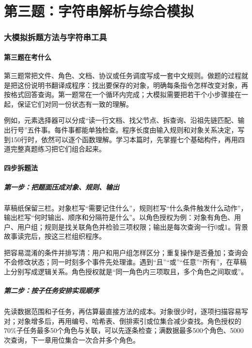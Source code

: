 \clearpage
\part{第三题：字符串解析与综合模拟}
\section{大模拟拆题方法与字符串工具}
\subsection{第三题在考什么}
第三题常把文件、角色、文档、协议或任务调度写成一套中文规则。做题的过程就是把这份说明书翻译成程序：找出要保存的对象，明确每条指令怎样改变对象，再按格式回答查询。第一题常在一个循环内完成；大模拟需要把若干个小步骤接在一起，保证它们对同一份状态有一致的理解。

例如，元素选择器可以分成“读一行文档、找父节点、拆查询、沿祖先链匹配、输出行号”五件事。每件事都能单独检查。程序长度由输入规则和对象关系决定，写到150行时，依然可以逐个函数理解。学习本篇时，先掌握七个基础构件，再用四道完整真题练习把它们组合起来。

\subsection{四步拆题法}
\subsubsection{第一步：把题面压成对象、规则、输出}
草稿纸保留三栏。对象栏写“需要记住什么”，规则栏写“什么条件触发什么动作”，输出栏写“何时输出、顺序和分隔符是什么”。以角色授权为例：对象有角色、用户、用户组；规则是找关联角色并检验三项权限；输出是每次查询一行0或1。背景故事读完后，按这三栏组织程序。

把容易混淆的条件并排写清：用户和用户组怎样区分；重复操作是否叠加；查询会不会修改状态；同一时刻多个事件先处理谁。遇到“且”“或”“任意”“所有”，在草稿上分别写成逻辑关系。角色授权就是“同一角色内三项取且，多个角色之间取或”。

\subsubsection{第二步：按子任务安排实现顺序}
先读数据范围和子任务，再估算最直接方法的成本。对象很少时，逐项扫描容易写对；对象增多后，再用编号、哈希表、倒排索引或位集合减少查找。角色授权的70\%子任务最多50个角色与关联，可以先逐条检查；满数据最多500个角色、5000次查询，下一章用位集合一次合并多个角色。

